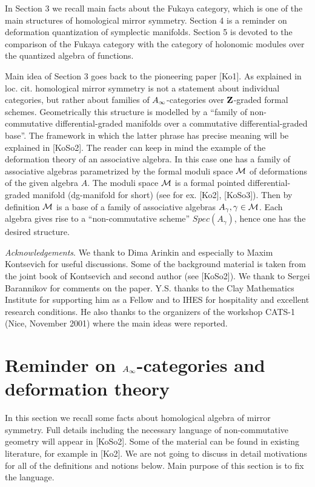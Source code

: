 \documentclass[a4paper,12pt]{article}
\begin{document}
In Section 3 we recall main facts about the Fukaya category,
which is one of the main structures of homological mirror
symmetry. Section 4 is a reminder on deformation quantization
of symplectic manifolds.
Section 5 is devoted to
the comparison of the Fukaya category with the category of
holonomic modules over the quantized algebra of functions.

Main idea of Section 3 goes back to the pioneering paper [Ko1]. As explained in loc. cit.
homological mirror symmetry is not a statement about
individual categories, but rather  about families of $A_{\infty}$-categories
over  ${\bf Z}$-graded formal schemes.
Geometrically this structure is modelled by a ``family
of non-commutative differential-graded manifolds over a
commutative differential-graded base''. The framework in
which the latter phrase has precise meaning will be explained
in [KoSo2]. The reader can keep in mind the example of the
deformation theory of an associative
algebra. In this case
one has a family of associative algebras parametrized by the formal moduli space
${\cal M}$ of deformations of the given algebra $A$. 
The moduli space ${\cal M}$
is a formal pointed differential-graded manifold (dg-manifold for short)
 (see for ex. [Ko2], [KoSo3]).
Then by definition ${\cal M}$ is a base of a family of associative algebras
$A_{\gamma}, \gamma \in {\cal M}$. Each algebra gives rise to
a ``non-commutative scheme'' $Spec(A_{\gamma})$, hence one has the
desired structure.

{\it Acknowledgements}. We thank to Dima Arinkin and
especially to Maxim Kontsevich for useful
discussions. 
Some of the background material is taken from
the joint book of Kontsevich and second author (see [KoSo2]).
 We thank to Sergei Barannikov 
for comments on the paper.
Y.S. thanks to the Clay Mathematics Institute for
supporting him as a Fellow and to IHES for hospitality
and excellent research conditions. He also thanks to the organizers
of the workshop CATS-1 (Nice, November 2001) where the main 
ideas were reported.

\section{Reminder on $A_{\infty}$-categories and deformation theory}

In this section we recall some facts about homological algebra of
mirror symmetry. Full details including the
necessary language of non-commutative geometry will appear in [KoSo2].
Some of the material can be found in existing literature,
for example in [Ko2]. We are not going to discuss in detail  motivations 
for all of the definitions and notions below.
Main purpose of this section is to fix the language. 
\end{document}
